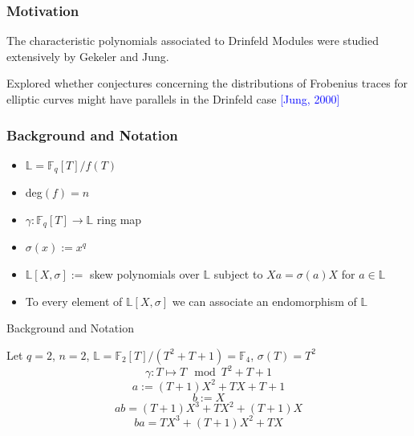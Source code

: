 \documentclass{beamer}
\newcommand{\f}{\mathbb{F}}
\newcommand{\blue}{\textcolor{blue}}
\begin{document}

\begin{frame}

\frametitle{Motivation}

\item The characteristic polynomials associated to Drinfeld Modules were studied extensively by Gekeler and Jung. 

\item Explored whether conjectures concerning the distributions of Frobenius traces for elliptic curves might have parallels in the Drinfeld case \blue{[Jung, 2000]}



    
\end{frame}




\begin{frame}
\frametitle{Background and Notation}

\begin{itemize}

\item $\mathbb{L} = \mathbb{F}_q[T]/f(T)$
\item deg$(f) = n$
\item $\gamma: \mathbb{F}_q[T] \to \mathbb{L}$ ring map
\item $\sigma(x) := x^q$
\item $\mathbb{L}[X,\sigma] := $ skew polynomials over $\mathbb{L}$ subject to $Xa = \sigma(a)X$ for $a \in \mathbb{L}$ 
\item To every element of $\mathbb{L}[X,\sigma]$ we can associate an endomorphism of $\mathbb{L}$

\end{itemize}
\end{frame}
\begin{frame}{Background and Notation}


\begin{example}
Let $q = 2$, $n=2$, $\mathbb{L} = \mathbb{F}_2[T]/(T^2 + T + 1) = \mathbb{F}_4$, $\sigma(T) = T^2$
\[ \gamma : T \mapsto T \mod T^2 + T + 1\]
\[ a:= (T + 1)X^2 + TX + T + 1 \]
\[b := X\]
\[ab = (T + 1)X^3 + TX^2 + (T + 1)X\]
\[ba = TX^3 + (T+1)X^2 + TX \]
\end{example}



\end{frame}
\end{document}
